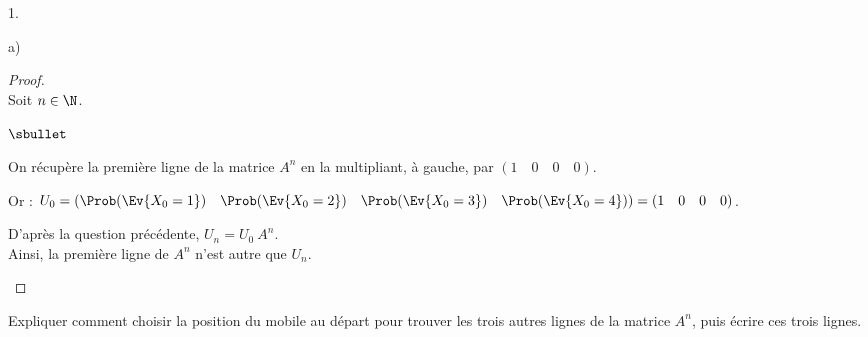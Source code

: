 \documentclass[11pt]{article}%
\begin{document}
\begin{noliste}{1.}
\begin{noliste}{a)}
    \begin{proof}~\\%
      Soit $n \in \N$.
      \begin{noliste}{$\sbullet$}
      \item On récupère la première ligne de la matrice $A^n$ en la
        multipliant, à gauche, par $(1 \quad 0 \quad 0 \quad 0)$.
      \item Or : $U_0 = (\Prob(\Ev{X_0 = 1}) \quad \Prob(\Ev{X_0 = 2})
        \quad \Prob(\Ev{X_0 = 3}) \quad \Prob(\Ev{X_0 = 4})) = (1
        \quad 0 \quad 0 \quad 0)$.
      \item D'après la question précédente, $U_n = U_0 \ A^n$.\\
        Ainsi, la première ligne de $A^n$ n'est autre que $U_n$.%
        ~\\[-1.2cm]
      \end{noliste}
    \end{proof}
  \end{noliste}
  
  
  \newpage
  
  
\item Expliquer comment choisir la position du mobile au départ pour
  trouver les trois autres lignes de la matrice $A^{n}$, puis écrire
  ces trois lignes.


\end{noliste}
\end{document}
